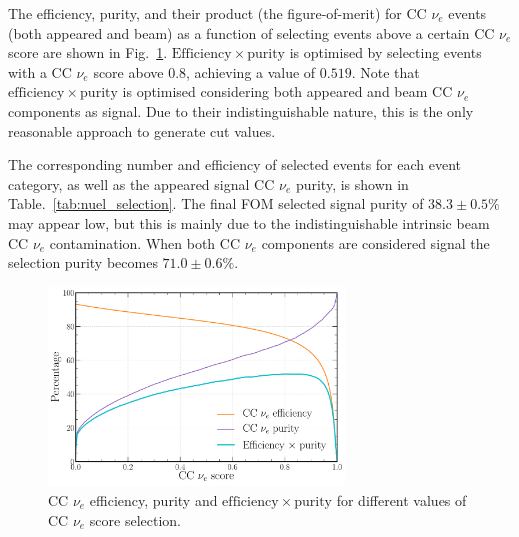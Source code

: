 The efficiency, purity, and their product (the figure-of-merit) for CC $\nu_{e}$ events (both
appeared and beam) as a function of selecting events above a certain CC $\nu_{e}$ score are shown
in Fig.~\ref{fig:final_nuel_eff_curves}. $\mathrm{Efficiency}\times\mathrm{purity}$ is optimised
by selecting events with a CC $\nu_{e}$ score above $0.8$, achieving a value of $0.519$. Note that
$\mathrm{efficiency}\times\mathrm{purity}$ is optimised considering both appeared and beam CC
$\nu_{e}$ components as signal. Due to their indistinguishable nature, this is the only reasonable
approach to generate cut values.

The corresponding number and efficiency of selected events for each event category, as well as the
appeared signal CC $\nu_{e}$ purity, is shown in Table.~\ref{tab:nuel_selection}. The final FOM
selected signal purity of $38.3\pm0.5\%$ may appear low, but this is mainly due to the
indistinguishable intrinsic beam CC $\nu_{e}$ contamination. When both CC $\nu_{e}$ components are
considered signal the selection purity becomes $71.0\pm0.6\%$.

\begin{figure} %
    \includegraphics[width=0.7\textwidth]{diagrams/7-results/final_nuel_eff_curves.pdf}
    \caption[CC $\nu_{e}$ efficiency, purity and $\mathrm{efficiency}\times\mathrm{purity}$]
    {CC $\nu_{e}$ efficiency, purity and $\mathrm{efficiency}\times\mathrm{purity}$ for different
        values of CC $\nu_{e}$ score selection.}
    \label{fig:final_nuel_eff_curves}
\end{figure}

